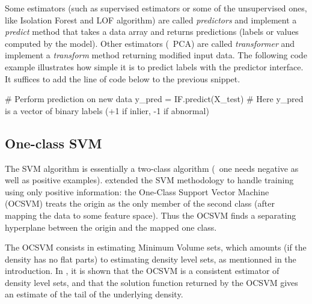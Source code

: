 Some estimators (such as supervised estimators or some of the unsupervised ones, like Isolation Forest and LOF algorithm) are called \emph{predictors} and implement a \emph{predict} method that takes a data array and returns predictions (labels or values computed by the model). Other estimators (\eg~PCA) are called \emph{transformer} and implement a \emph{transform} method returning modified input data.
The following code example illustrates how simple it is to predict labels with the predictor interface. It suffices to add the line of code below to the previous snippet.

\begin{pythoncode} 
# Perform prediction on new data
y_pred = IF.predict(X_test)  
# Here y_pred is a vector of binary labels (+1 if inlier, -1 if abnormal)
\end{pythoncode}





\subsection{One-class SVM}

The SVM algorithm is essentially a two-class algorithm (\ie~one needs negative as well as positive examples).
\cite{Scholkopf2001} extended the SVM methodology to handle training using only positive information:
the One-Class Support Vector Machine (OCSVM) treats the origin as the only member of the second class (after mapping the data to some feature space). Thus the OCSVM finds a separating hyperplane between the origin and the mapped one class. %

The OCSVM consists in estimating Minimum Volume sets, which amounts (if the density has no flat parts) to estimating density level sets, as mentionned in the introduction.
In \cite{VertVert}, it is shown that the OCSVM is a consistent estimator of density level sets, and that the solution function returned by the OCSVM gives an estimate of the tail of the underlying density.


